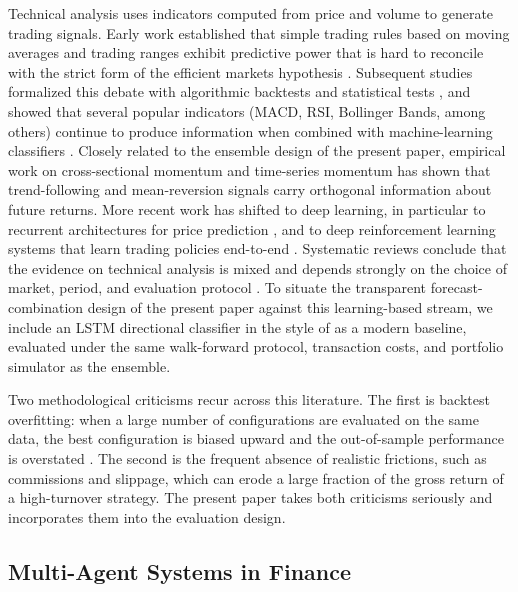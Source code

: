 \documentclass{ieeeaccess}
\begin{document}
Technical analysis uses indicators computed from price and volume to generate trading signals. Early work established that simple trading rules based on moving averages and trading ranges exhibit predictive power that is hard to reconcile with the strict form of the efficient markets hypothesis \cite{brock1992}. Subsequent studies formalized this debate with algorithmic backtests and statistical tests \cite{boboc2013}, and showed that several popular indicators (MACD, RSI, Bollinger Bands, among others) continue to produce information when combined with machine-learning classifiers \cite{gerlein2016}. Closely related to the ensemble design of the present paper, empirical work on cross-sectional momentum \cite{jegadeeshtitman1993,asness2013} and time-series momentum \cite{moskowitz2012} has shown that trend-following and mean-reversion signals carry orthogonal information about future returns. More recent work has shifted to deep learning, in particular to recurrent architectures for price prediction \cite{fischerkrauss2018}, and to deep reinforcement learning systems that learn trading policies end-to-end \cite{huang2022,shavandi2022,hambly2023,anders2024empirical}. Systematic reviews conclude that the evidence on technical analysis is mixed and depends strongly on the choice of market, period, and evaluation protocol \cite{nti2020,kruczkowski2026review}. To situate the transparent forecast-combination design of the present paper against this learning-based stream, we include an LSTM directional classifier in the style of \cite{fischerkrauss2018} as a modern baseline, evaluated under the same walk-forward protocol, transaction costs, and portfolio simulator as the ensemble.

Two methodological criticisms recur across this literature. The first is backtest overfitting: when a large number of configurations are evaluated on the same data, the best configuration is biased upward and the out-of-sample performance is overstated \cite{bailey2014,harvey2016}. The second is the frequent absence of realistic frictions, such as commissions and slippage, which can erode a large fraction of the gross return of a high-turnover strategy. The present paper takes both criticisms seriously and incorporates them into the evaluation design.

\subsection{Multi-Agent Systems in Finance}
\end{document}
